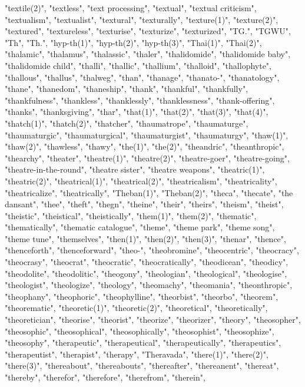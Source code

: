 "textile(2)",
"textless",
"text processing",
"textual",
"textual criticism",
"textualism",
"textualist",
"textural",
"texturally",
"texture(1)",
"texture(2)",
"textured",
"textureless",
"texturise",
"texturize",
"texturized",
"TG.",
"TGWU",
"Th",
"Th.",
"hyp-th(1)",
"hyp-th(2)",
"hyp-th(3)",
"Thai(1)",
"Thai(2)",
"thalamic",
"thalamus",
"thalassic",
"thaler",
"thalidomide",
"thalidomide baby",
"thalidomide child",
"thalli",
"thallic",
"thallium",
"thalloid",
"thallophyte",
"thallous",
"thallus",
"thalweg",
"than",
"thanage",
"thanato-",
"thanatology",
"thane",
"thanedom",
"thaneship",
"thank",
"thankful",
"thankfully",
"thankfulness",
"thankless",
"thanklessly",
"thanklessness",
"thank-offering",
"thanks",
"thanksgiving",
"thar",
"that(1)",
"that(2)",
"that(3)",
"that(4)",
"thatch(1)",
"thatch(2)",
"thatcher",
"thaumatrope",
"thaumaturge",
"thaumaturgic",
"thaumaturgical",
"thaumaturgist",
"thaumaturgy",
"thaw(1)",
"thaw(2)",
"thawless",
"thawy",
"the(1)",
"the(2)",
"theandric",
"theanthropic",
"thearchy",
"theater",
"theatre(1)",
"theatre(2)",
"theatre-goer",
"theatre-going",
"theatre-in-the-round",
"theatre sister",
"theatre weapons",
"theatric(1)",
"theatric(2)",
"theatrical(1)",
"theatrical(2)",
"theatricalism",
"theatricality",
"theatricalize",
"theatrically",
"Theban(1)",
"Theban(2)",
"theca",
"thecate",
"the dansant",
"thee",
"theft",
"thegn",
"theine",
"their",
"theirs",
"theism",
"theist",
"theistic",
"theistical",
"theistically",
"them(1)",
"them(2)",
"thematic",
"thematically",
"thematic catalogue",
"theme",
"theme park",
"theme song",
"theme tune",
"themselves",
"then(1)",
"then(2)",
"then(3)",
"thenar",
"thence",
"thenceforth",
"thenceforward",
"theo-",
"theobromine",
"theocentric",
"theocracy",
"theocrasy",
"theocrat",
"theocratic",
"theocratically",
"theodicean",
"theodicy",
"theodolite",
"theodolitic",
"theogony",
"theologian",
"theological",
"theologise",
"theologist",
"theologize",
"theology",
"theomachy",
"theomania",
"theonthropic",
"theophany",
"theophoric",
"theophylline",
"theorbist",
"theorbo",
"theorem",
"theorematic",
"theoretic(1)",
"theoretic(2)",
"theoretical",
"theoretically",
"theoretician",
"theorise",
"theorist",
"theorize",
"theorizer",
"theory",
"theosopher",
"theosophic",
"theosophical",
"theosophically",
"theosophist",
"theosophize",
"theosophy",
"therapeutic",
"therapeutical",
"therapeutically",
"therapeutics",
"therapeutist",
"therapist",
"therapy",
"Theravada",
"there(1)",
"there(2)",
"there(3)",
"thereabout",
"thereabouts",
"thereafter",
"thereanent",
"thereat",
"thereby",
"therefor",
"therefore",
"therefrom",
"therein",
